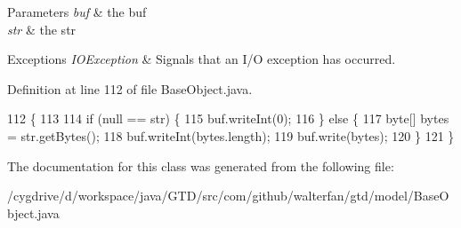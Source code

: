 \begin{DoxyParams}{Parameters}
{\em buf} & the buf \\
\hline
{\em str} & the str \\
\hline
\end{DoxyParams}

\begin{DoxyExceptions}{Exceptions}
{\em I\-O\-Exception} & Signals that an I/\-O exception has occurred. \\
\hline
\end{DoxyExceptions}


Definition at line 112 of file Base\-Object.\-java.


\begin{DoxyCode}
112                                                                                 \{
113 
114         \textcolor{keywordflow}{if} (null == str) \{
115             buf.writeInt(0);
116         \} \textcolor{keywordflow}{else} \{
117             byte[] bytes = str.getBytes();
118             buf.writeInt(bytes.length);
119             buf.write(bytes);
120         \}
121     \}
\end{DoxyCode}


The documentation for this class was generated from the following file\-:\begin{DoxyCompactItemize}
\item 
/cygdrive/d/workspace/java/\-G\-T\-D/src/com/github/walterfan/gtd/model/Base\-Object.\-java\end{DoxyCompactItemize}

